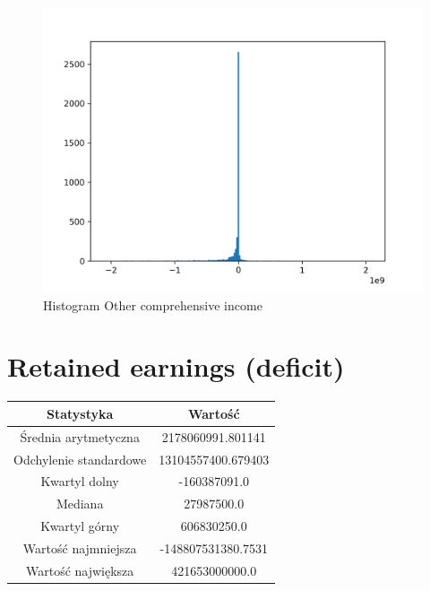 \documentclass{article}
\begin{document}
\begin{figure}[h!]
    \includegraphics[width=\linewidth]{variables/Other comprehensive income.png}
    \caption{Histogram Other comprehensive income }
\end{figure}\section{ Retained earnings (deficit) }

\begin{center}
    \begin{tabular}{|c | c|} 
    \hline
    Statystyka & Wartość \\
    \hline\hline
    Średnia arytmetyczna & 2178060991.801141 \\ 
    \hline
    Odchylenie standardowe & 13104557400.679403 \\
    \hline
    Kwartyl dolny & -160387091.0 \\
    \hline
    Mediana & 27987500.0 \\
    \hline
    Kwartyl górny & 606830250.0 \\
    \hline
    Wartość najmniejsza & -148807531380.7531 \\
    \hline
    Wartość największa & 421653000000.0 \\
    \hline
   \end{tabular}
\end{center}
\end{document}
